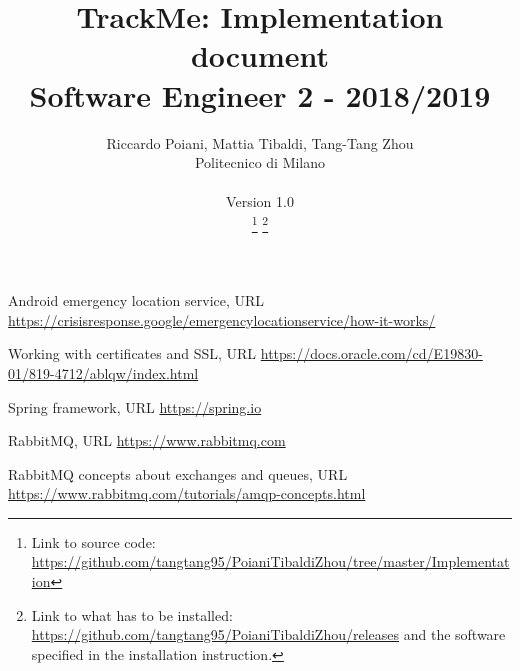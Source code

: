 \documentclass[a4paper]{article}
\begin{document}
\title{TrackMe: Implementation document \\Software Engineer 2 - 2018/2019}
\author{
        Riccardo Poiani, Mattia Tibaldi, Tang-Tang Zhou \\
        Politecnico di Milano\\\\ 
        Version 1.0 \\
        \thanks{
		Link to source code:
        \url{https://github.com/tangtang95/PoianiTibaldiZhou/tree/master/Implementation}}
        \thanks{
	    Link to what has to be installed:
	    \url{https://github.com/tangtang95/PoianiTibaldiZhou/releases} and the software specified in the installation instruction.}
}
\maketitle
\newpage
\tableofcontents
\newpage













\newpage

\begin{thebibliography}{9}

Android emergency location service, URL \url{https://crisisresponse.google/emergencylocationservice/how-it-works/}

Working with certificates and SSL, URL \url{https://docs.oracle.com/cd/E19830-01/819-4712/ablqw/index.html}

Spring framework, URL \url{https://spring.io}

RabbitMQ, URL \url{https://www.rabbitmq.com}

RabbitMQ concepts about exchanges and queues, URL \url{https://www.rabbitmq.com/tutorials/amqp-concepts.html}

\end{thebibliography}
\end{document}
